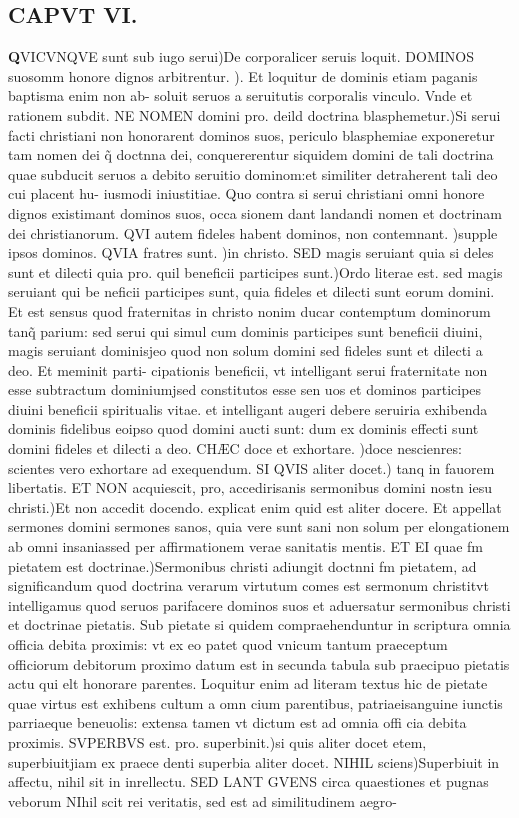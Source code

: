 \documentclass{article}
\begin{document}
\begin{pages}
\endnumbering\beginnumbering\section{CAPVT VI.}\pstart \huge\textbf{Q}\normalsize VICVNQVE sunt sub iugo serui)De corporalicer seruis loquit. DOMINOS suosomm honore dignos arbitrentur. ). Et loquitur de dominis etiam paganis baptisma enim non ab- soluit seruos a seruitutis corporalis vinculo. Vnde et rationem subdit. NE NOMEN domini pro. deild doctrina blasphemetur.)Si serui facti christiani non honorarent dominos suos, periculo blasphemiae exponeretur tam nomen dei q̃ doctnna dei, conquererentur siquidem domini de tali doctrina quae subducit seruos a debito seruitio dominom:et similiter detraherent tali deo cui placent hu- iusmodi iniustitiae. Quo contra si serui christiani omni honore dignos existimant dominos suos, occa sionem dant landandi nomen et doctrinam dei christianorum. QVI autem fideles habent dominos, non contemnant. )supple ipsos dominos. QVIA fratres sunt. )in christo. SED magis seruiant quia si deles sunt et dilecti quia pro. quil beneficii participes sunt.)Ordo literae est. sed magis seruiant qui be neficii participes sunt, quia fideles et dilecti sunt eorum domini. Et est sensus quod fraternitas in christo nonim ducar contemptum dominorum tanq̃ parium: sed serui qui simul cum dominis participes sunt beneficii diuini, magis seruiant dominisjeo quod non solum domini sed fideles sunt et dilecti a deo. Et meminit parti- cipationis beneficii, vt intelligant serui fraternitate non esse subtractum dominiumjsed constitutos esse sen uos et dominos participes diuini beneficii spiritualis vitae. et intelligant augeri debere seruiria exhibenda dominis fidelibus eoipso quod domini aucti sunt: dum ex dominis effecti sunt domini fideles et dilecti a deo. CHÆC doce et exhortare. )doce nescienres: scientes vero exhortare ad exequendum. SI QVIS aliter docet.) tanq in fauorem libertatis. ET NON acquiescit, pro, accedirisanis sermonibus domini nostn iesu christi.)Et non accedit docendo. explicat enim quid est aliter docere. Et appellat sermones domini sermones sanos, quia vere sunt sani non solum per elongationem ab omni insaniassed per affirmationem verae sanitatis mentis. ET EI quae fm pietatem est doctrinae.)Sermonibus christi adiungit doctnni fm pietatem, ad significandum quod doctrina verarum virtutum comes est sermonum christitvt intelligamus quod seruos parifacere dominos suos et aduersatur sermonibus christi et doctrinae pietatis. Sub pietate si quidem compraehenduntur in scriptura omnia officia debita proximis: vt ex eo patet quod vnicum tantum praeceptum officiorum debitorum proximo datum est in secunda tabula sub praecipuo pietatis actu qui elt honorare parentes. Loquitur enim ad literam textus hic de pietate quae virtus est exhibens cultum a omn cium parentibus, patriaeisanguine iunctis parriaeque beneuolis: extensa tamen vt dictum est ad omnia offi cia debita proximis. SVPERBVS est. pro. superbinit.)si quis aliter docet etem, superbiuitjiam ex praece denti superbia aliter docet. NIHIL sciens)Superbiuit in affectu, nihil sit in inrellectu. SED LANT GVENS circa quaestiones et pugnas veborum NIhil scit rei veritatis, sed est ad similitudinem aegro-  \pend

\end{pages}
\end{document}

